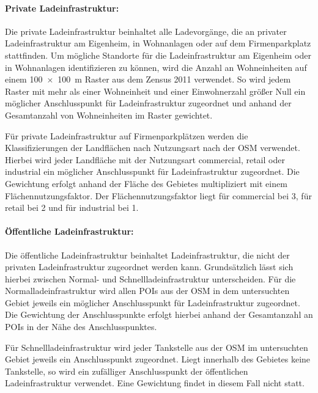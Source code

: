 \paragraph{Private Ladeinfrastruktur:}

Die private Ladeinfrastruktur beinhaltet alle Ladevorgänge, die an privater Ladeinfrastruktur am Eigenheim, in Wohnanlagen oder auf dem Firmenparkplatz stattfinden.
Um mögliche Standorte für die Ladeinfrastruktur am Eigenheim oder in Wohnanlagen identifizieren zu können, wird die Anzahl an Wohneinheiten auf einem \SI{100 x 100}{\m} Raster aus dem Zensus 2011 \cite{StatistischesBundesamt2011} verwendet.
So wird jedem Raster mit mehr als einer Wohneinheit und einer Einwohnerzahl größer Null ein möglicher Anschlusspunkt für Ladeinfrastruktur zugeordnet und anhand der Gesamtanzahl von Wohneinheiten im Raster gewichtet. \medskip

Für private Ladeinfrastruktur auf Firmenparkplätzen werden die Klassifizierungen der Landflächen nach Nutzungsart nach der \gls{OSM} \cite{OpenStreetMapFoundation} verwendet.
Hierbei wird jeder Landfläche mit der Nutzungsart \glqq commercial\grqq , \glqq retail\grqq{} oder \glqq industrial\grqq{} ein möglicher Anschlusspunkt für Ladeinfrastruktur zugeordnet.
Die Gewichtung erfolgt anhand der Fläche des Gebietes multipliziert mit einem Flächennutzungsfaktor.
Der Flächennutzungsfaktor liegt für \glqq commercial\grqq{} bei \num{3}, für \glqq retail\grqq{} bei \num{2} und für \glqq industrial\grqq{} bei \num{1}.


\paragraph{Öffentliche Ladeinfrastruktur:}

Die öffentliche Ladeinfrastruktur beinhaltet Ladeinfrastruktur, die nicht der privaten Ladeinfrastruktur zugeordnet werden kann.
Grundsätzlich lässt sich hierbei zwischen Normal- und Schnellladeinfrastruktur unterscheiden.
Für die Normalladeinfrastruktur wird allen \glspl{POI} aus der \gls{OSM} \cite{OpenStreetMapFoundation} in dem untersuchten Gebiet jeweils ein möglicher Anschlusspunkt für Ladeinfrastruktur zugeordnet.
Die Gewichtung der Anschlusspunkte erfolgt hierbei anhand der Gesamtanzahl an \glspl{POI} in der Nähe des Anschlusspunktes.\medskip

Für Schnellladeinfrastruktur wird jeder Tankstelle aus der \gls{OSM} \cite{OpenStreetMapFoundation} im untersuchten Gebiet jeweils ein Anschlusspunkt zugeordnet.
Liegt innerhalb des Gebietes keine Tankstelle, so wird ein zufälliger Anschlusspunkt der öffentlichen Ladeinfrastruktur verwendet.
Eine Gewichtung findet in diesem Fall nicht statt.


